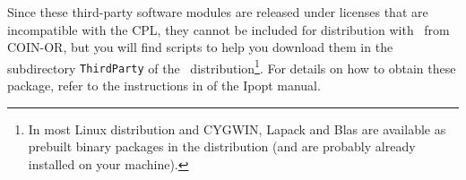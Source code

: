 Since these third-party software modules are released under licenses
that are incompatible with the CPL, they cannot be included for
distribution with \Bonmin\ from COIN-OR, but you will find scripts
to help you download them in the subdirectory {\tt ThirdParty} of
the \Bonmin\ distribution\footnote{In most Linux distribution and
CYGWIN, Lapack and Blas are available as prebuilt binary packages in
the distribution (and are probably already installed on your
machine).}. For details on how to obtain these package, refer to the
instructions in
 of the Ipopt manual.\\
